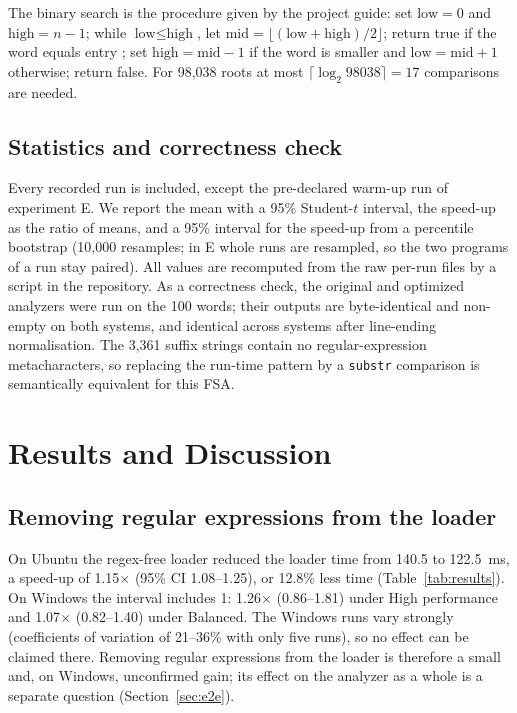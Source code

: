 \documentclass[conference]{IEEEtran}
\begin{document}
The binary search is the procedure given by the project guide: set $\text{low}=0$ and $\text{high}=n-1$; while $\text{low}\le\text{high}$, let $\text{mid}=\lfloor(\text{low}+\text{high})/2\rfloor$; return true if the word equals entry ; set $\text{high}=\text{mid}-1$ if the word is smaller and $\text{low}=\text{mid}+1$ otherwise; return false. For 98,038 roots at most $\lceil\log_2 98038\rceil=17$ comparisons are needed.

\subsection{Statistics and correctness check}
Every recorded run is included, except the pre-declared warm-up run of experiment E. We report the mean with a 95\% Student-$t$ interval, the speed-up as the ratio of means, and a 95\% interval for the speed-up from a percentile bootstrap (10,000 resamples; in E whole runs are resampled, so the two programs of a run stay paired). All values are recomputed from the raw per-run files by a script in the repository. As a correctness check, the original and optimized analyzers were run on the 100 words; their outputs are byte-identical and non-empty on both systems, and identical across systems after line-ending normalisation. The 3,361 suffix strings contain no regular-expression metacharacters, so replacing the run-time pattern by a \texttt{substr} comparison is semantically equivalent for this FSA.

\begin{table}[t]
\caption{Results (ms, mean with 95\% interval in brackets; speed-up with 95\% bootstrap interval in parentheses). Ubuntu 24.04, \texttt{performance} governor, against Windows 10, High-performance plan, on the same laptop. All runs included. Speed-ups are relative to the baseline of the same experiment.}
\label{tab:results}
\centering\small

\end{table}

\section{Results and Discussion}
\subsection{Removing regular expressions from the loader}
On Ubuntu the regex-free loader reduced the loader time from 140.5 to 122.5~ms, a speed-up of 1.15$\times$ (95\% CI 1.08--1.25), or 12.8\% less time (Table~\ref{tab:results}). On Windows the interval includes 1: 1.26$\times$ (0.86--1.81) under High performance and 1.07$\times$ (0.82--1.40) under Balanced. The Windows runs vary strongly (coefficients of variation of 21--36\% with only five runs), so no effect can be claimed there. Removing regular expressions from the loader is therefore a small and, on Windows, unconfirmed gain; its effect on the analyzer as a whole is a separate question (Section~\ref{sec:e2e}).
\end{document}

